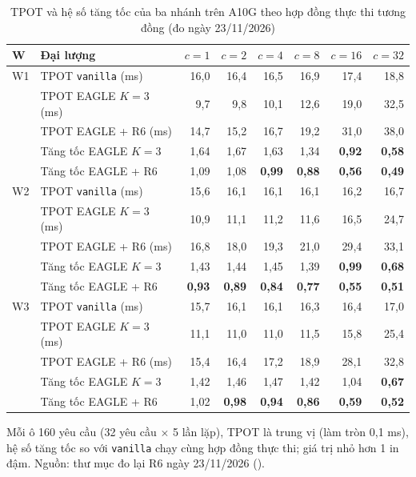 \begin{table}[htbp]
\centering
\caption{TPOT và hệ số tăng tốc của ba nhánh trên A10G theo hợp đồng thực thi tương đồng (đo ngày 23/11/2026)}
\label{tab:r6}
\small
\begin{tabular}{@{}llrrrrrr@{}}
\toprule
\textbf{W} & \textbf{Đại lượng} & $c=1$ & $c=2$ & $c=4$ & $c=8$ & $c=16$ & $c=32$ \\
\midrule
W1 & TPOT \texttt{vanilla} (ms) & 16{,}0 & 16{,}4 & 16{,}5 & 16{,}9 & 17{,}4 & 18{,}8 \\
 & TPOT EAGLE $K=3$ (ms) & 9{,}7 & 9{,}8 & 10{,}1 & 12{,}6 & 19{,}0 & 32{,}5 \\
 & TPOT EAGLE + R6 (ms) & 14{,}7 & 15{,}2 & 16{,}7 & 19{,}2 & 31{,}0 & 38{,}0 \\
 & Tăng tốc EAGLE $K=3$ & 1{,}64 & 1{,}67 & 1{,}63 & 1{,}34 & \textbf{0{,}92} & \textbf{0{,}58} \\
 & Tăng tốc EAGLE + R6 & 1{,}09 & 1{,}08 & \textbf{0{,}99} & \textbf{0{,}88} & \textbf{0{,}56} & \textbf{0{,}49} \\
\midrule
W2 & TPOT \texttt{vanilla} (ms) & 15{,}6 & 16{,}1 & 16{,}1 & 16{,}1 & 16{,}2 & 16{,}7 \\
 & TPOT EAGLE $K=3$ (ms) & 10{,}9 & 11{,}1 & 11{,}2 & 11{,}6 & 16{,}5 & 24{,}7 \\
 & TPOT EAGLE + R6 (ms) & 16{,}8 & 18{,}0 & 19{,}3 & 21{,}0 & 29{,}4 & 33{,}1 \\
 & Tăng tốc EAGLE $K=3$ & 1{,}43 & 1{,}44 & 1{,}45 & 1{,}39 & \textbf{0{,}99} & \textbf{0{,}68} \\
 & Tăng tốc EAGLE + R6 & \textbf{0{,}93} & \textbf{0{,}89} & \textbf{0{,}84} & \textbf{0{,}77} & \textbf{0{,}55} & \textbf{0{,}51} \\
\midrule
W3 & TPOT \texttt{vanilla} (ms) & 15{,}7 & 16{,}1 & 16{,}1 & 16{,}3 & 16{,}4 & 17{,}0 \\
 & TPOT EAGLE $K=3$ (ms) & 11{,}1 & 11{,}0 & 11{,}0 & 11{,}5 & 15{,}8 & 25{,}4 \\
 & TPOT EAGLE + R6 (ms) & 15{,}4 & 16{,}4 & 17{,}2 & 18{,}9 & 28{,}1 & 32{,}8 \\
 & Tăng tốc EAGLE $K=3$ & 1{,}42 & 1{,}46 & 1{,}47 & 1{,}42 & 1{,}04 & \textbf{0{,}67} \\
 & Tăng tốc EAGLE + R6 & 1{,}02 & \textbf{0{,}98} & \textbf{0{,}94} & \textbf{0{,}86} & \textbf{0{,}59} & \textbf{0{,}52} \\
\bottomrule
\end{tabular}

\vspace{2pt}
{\footnotesize Mỗi ô 160 yêu cầu (32 yêu cầu $\times$ 5 lần lặp), TPOT là trung vị (làm tròn 0,1 ms), hệ số tăng tốc so với \texttt{vanilla} chạy cùng hợp đồng thực thi; giá trị nhỏ hơn 1 in đậm. Nguồn: thư mục đo lại R6 ngày 23/11/2026 ().}
\end{table}
